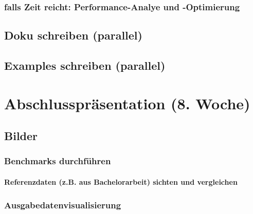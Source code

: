 \documentclass[a4paper]{article}
\begin{document}
\subsubsection{falls Zeit reicht: Performance-Analye und -Optimierung}
\subsection{Doku schreiben (parallel)}
\subsection{Examples schreiben (parallel)}
\section{Abschlusspräsentation (8. Woche)}
\subsection{Bilder}
\subsubsection{Benchmarks durchführen}
\paragraph{Referenzdaten (z.B. aus Bachelorarbeit) sichten und vergleichen}
\subsubsection{Ausgabedatenvisualisierung}
\end{document}
